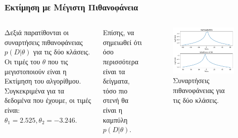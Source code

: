 \documentclass{beamer}
\begin{document}
\begin{frame}
\frametitle{Εκτίμηση με Μέγιστη Πιθανοφάνεια}

\begin{columns}

    
    Δεξιά παρατίθονται οι συναρτήσεις πιθανοφάνειας $p(D|\theta)$ για τις 
    δύο κλάσεις. Οι τιμές του $\theta$ που τις μεγιστοποιούν είναι η Εκτίμηση
    του αλγορίθμου. Συγκεκριμένα για τα δεδομένα που έχουμε, οι τιμές είναι:
    $\theta_1 = 2.525, \theta_2 = -3.246$.

    Επίσης, να σημειωθεί ότι όσο περισσότερα είναι τα δείγματα, τόσο πιο 
    στενή θα είναι η καμπύλη $p(D|\theta)$.



    \begin{figure}
        \centering
            \includegraphics[width=\textwidth]{./plots/likelihoods.pdf}
            \caption{Συναρτήσεις πιθανοφάνειας για τις δύο κλάσεις.}
            \label{fig:likelihoods}
    \end{figure}


\end{columns}


    

\end{frame}
\end{document}
